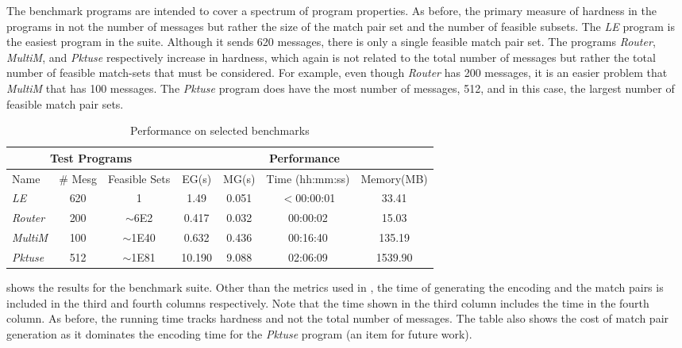 The benchmark programs are intended to cover a spectrum of program
properties. As before, the primary measure of hardness in the programs
in not the number of messages but rather the size of the match pair
set and the number of feasible subsets.  The \textit{LE} program is
the easiest program in the suite. Although it sends 620 messages,
there is only a single feasible match pair set. The programs
\textit{Router}, \textit{MultiM}, and \textit{Pktuse} respectively
increase in hardness, which again is not related to the total number
of messages but rather the total number of feasible match-sets that
must be considered. For example, even though \textit{Router} has 200
messages, it is an easier problem that \textit{MultiM} that has 100
messages. The \textit{Pktuse} program does have the most number of
messages, 512, and in this case, the largest number of feasible
match pair sets.

\begin{table}[t]
\begin{center}
\setlength{\tabcolsep}{2pt}
\scriptsize
\caption{Performance on selected benchmarks \label{table:second}}
\begin{tabular}{|l|c|c|c|c|c|c|}
		\hline
         \multicolumn{3}{|c|}{Test Programs} & \multicolumn{4}{|c|}{Performance} \\ \hline
         Name & \# Mesg & Feasible Sets & EG(s) & MG(s) & Time (hh:mm:ss) & Memory(MB) \\ \hline
         \textit{LE} & 620 & 1 & 1.49 & 0.051 & $<$00:00:01 & 33.41  \\ %
         \textit{Router} & 200 & $\sim$6E2 & 0.417 & 0.032 & 00:00:02 & 15.03  \\ %
         \textit{MultiM} & 100 & $\sim$1E40 & 0.632 & 0.436 &  00:16:40 & 135.19  \\ %
         \textit{Pktuse} & 512 & $\sim$1E81 & 10.190 & 9.088 & 02:06:09 & 1539.90 \\ %
         \hline
		\end{tabular}
\end{center}
\end{table}

 shows the results for the benchmark
suite. Other than the metrics used in , the time
of generating the encoding and the match pairs is included in the
third and fourth columns respectively. Note that the time shown in the
third column includes the time in the fourth column. As before, the
running time tracks hardness and not the total number of messages. The
table also shows the cost of match pair generation as it dominates the
encoding time for the \textit{Pktuse} program (an item for future work).

